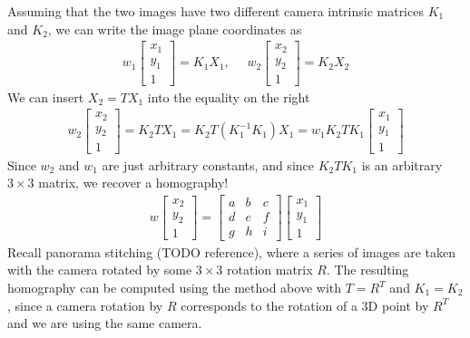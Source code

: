\documentclass[11pt]{article}
\begin{document}
Assuming that the two images have two different camera intrinsic matrices $K_1$ and $K_2$, we can write the image plane coordinates as 
\begin{align*}
    w_1 \begin{bmatrix}
        x_1 \\ y_1 \\ 1 
    \end{bmatrix} = K_1 X_1, ~~~~~~
    w_2 \begin{bmatrix}
        x_2 \\ y_2 \\ 1 
    \end{bmatrix} = K_2 X_2
\end{align*}
We can insert $X_2 = TX_1$ into the equality on the right 
\begin{align*}
    w_2 \begin{bmatrix}
        x_2 \\ y_2 \\ 1 
    \end{bmatrix} 
    = K_2 T X_1 = K_2 T (K_1^{-1} K_1) X_1 = w_1 K_2 T K_1 
    \begin{bmatrix}
        x_1 \\ y_1 \\ 1
    \end{bmatrix} 
\end{align*}
Since $w_2$ and $w_1$ are just arbitrary constants, and since $K_2 T K_1$ is an arbitrary $3 \times 3$ matrix, we recover a homography!
\begin{align*}
    w \begin{bmatrix}
        x_2 \\ y_2 \\ 1
    \end{bmatrix} 
    = 
    \begin{bmatrix}
        a & b & c \\ d & e & f \\ g & h & i 
    \end{bmatrix}
    \begin{bmatrix}
        x_1 \\ y_1 \\ 1 
    \end{bmatrix}
\end{align*}
Recall panorama stitching (TODO reference), where a series of images are taken with the camera rotated by some $3 \times 3$ rotation matrix $R$. The resulting homography can be computed using the method above with $T = R^T$ and $K_1 = K_2$, since a camera rotation by $R$ corresponds to the rotation of a 3D point by $R^T$ and we are using the same camera. 
\end{document}
